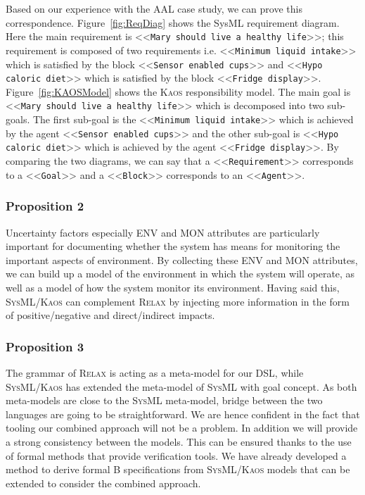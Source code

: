 \documentclass[10pt, conference, compsocconf]{IEEEtran}
\def\myrelax{\textsc{Relax}}                  %
\def\sysml{\textsc{SysML}}
\def\kaos{\textsc{Kaos}}
\newcommand{\Myfig}[1]{Figure~\ref{fig:#1}}
\newcommand{\stereotype}[1]{\textless\textless\texttt{#1}\textgreater\textgreater}
\begin{document}
Based on our experience with the AAL case study, we can prove this correspondence. \Myfig{ReqDiag} shows the SysML requirement diagram. Here the main requirement is \stereotype{Mary should live a healthy life}; this requirement is composed of two requirements i.e. \stereotype{Minimum liquid intake} which is satisfied by the block \stereotype{Sensor enabled cups} and \stereotype{Hypo caloric diet} which is satisfied by the block \stereotype{Fridge display}. \Myfig{KAOSModel} shows the \kaos{} responsibility model. The main goal is \stereotype{Mary should live a healthy life} which is decomposed into two sub-goals. The first sub-goal is the \stereotype{Minimum liquid intake} which is achieved by the agent \stereotype{Sensor enabled cups} and the other sub-goal is \stereotype{Hypo caloric diet} which is achieved by the agent \stereotype{Fridge display}. By comparing the two diagrams, we can say that a \stereotype{Requirement} corresponds to a \stereotype{Goal} and a \stereotype{Block} corresponds to an \stereotype{Agent}.

\subsubsection*{Proposition 2}

Uncertainty factors especially ENV and MON attributes are particularly important for documenting whether the system has means for monitoring the important aspects of environment. By collecting these ENV and MON attributes, we can build up a model of the environment in which the system will operate, as well as a model of how the system monitor its environment. Having said this, \sysml{}/\kaos{} can complement \myrelax{} by injecting more information in the form of positive/negative and direct/indirect impacts. 

\subsubsection*{Proposition 3}

The grammar of \myrelax{} is acting as a meta-model for our DSL, while \sysml{}/\kaos{} has extended the meta-model of \sysml{} with goal concept. As both meta-models are close to the \sysml{} meta-model, bridge between the two languages are going to be straightforward. We are hence confident in the fact that tooling our combined approach will not be a problem. In addition we will provide a strong consistency between the models. This can be ensured thanks to the use of formal methods that provide verification tools. We have already developed a method to derive formal B specifications from \sysml{}/\kaos{} models that can be extended to consider the combined approach.
\end{document}

